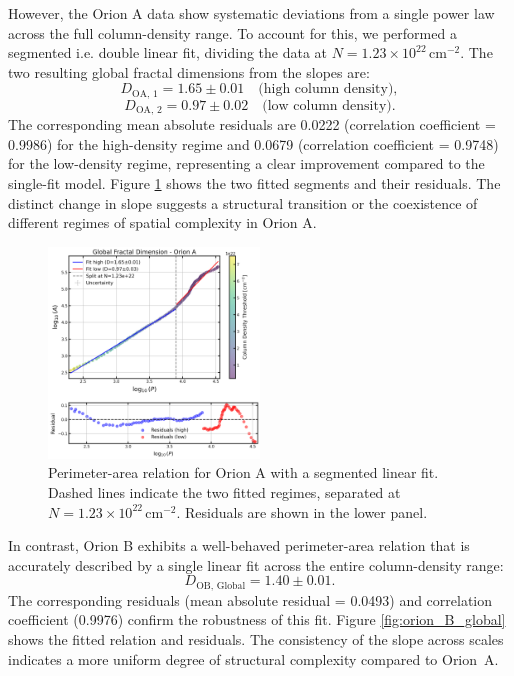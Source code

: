 However, the Orion A data show systematic deviations from a single power law across the full column-density range. To account for this, we performed a segmented i.e. double linear fit, dividing the data at \(N = 1.23 \times 10^{22}\,\mathrm{cm}^{-2}\). The two resulting global fractal dimensions from the slopes are:
\[
D_{\mathrm{OA,\,1}} = 1.65 \pm 0.01 \quad \text{(high column density)},
\]
\[
D_{\mathrm{OA,\,2}} = 0.97 \pm 0.02 \quad \text{(low column density)}.
\]
The corresponding mean absolute residuals are 0.0222 (correlation coefficient = 0.9986) for the high-density regime and 0.0679 (correlation coefficient = 0.9748) for the low-density regime, representing a clear improvement compared to the single-fit model.  
Figure \ref{fig:orion_A_global_double_fit} shows the two fitted segments and their residuals. The distinct change in slope suggests a structural transition or the coexistence of different regimes of spatial complexity in Orion A.

\begin{figure}[t]
    \centering
    \includegraphics[width=0.5\textwidth]{figures/orion_A_global_double_fit.png}
    \caption{Perimeter-area relation for Orion A with a segmented linear fit. Dashed lines indicate the two fitted regimes, separated at \(N = 1.23 \times 10^{22}\,\mathrm{cm}^{-2}\). Residuals are shown in the lower panel.}
    \label{fig:orion_A_global_double_fit}
\end{figure}

In contrast, Orion B exhibits a well-behaved perimeter-area relation that is accurately described by a single linear fit across the entire column-density range:
\[
D_{\mathrm{OB,\,Global}} = 1.40 \pm 0.01 .
\]
The corresponding residuals (mean absolute residual = 0.0493) and correlation coefficient (0.9976) confirm the robustness of this fit. Figure \ref{fig:orion_B_global} shows the fitted relation and residuals. The consistency of the slope across scales indicates a more uniform degree of structural complexity compared to Orion~A.

